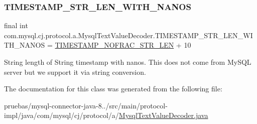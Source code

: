\subsubsection{\texorpdfstring{T\+I\+M\+E\+S\+T\+A\+M\+P\+\_\+\+S\+T\+R\+\_\+\+L\+E\+N\+\_\+\+W\+I\+T\+H\+\_\+\+N\+A\+N\+OS}{TIMESTAMP\_STR\_LEN\_WITH\_NANOS}}
{\footnotesize\ttfamily final int com.\+mysql.\+cj.\+protocol.\+a.\+Mysql\+Text\+Value\+Decoder.\+T\+I\+M\+E\+S\+T\+A\+M\+P\+\_\+\+S\+T\+R\+\_\+\+L\+E\+N\+\_\+\+W\+I\+T\+H\+\_\+\+N\+A\+N\+OS = \mbox{\hyperlink{classcom_1_1mysql_1_1cj_1_1protocol_1_1a_1_1_mysql_text_value_decoder_a8231f45af061c93c4b82283c5f00d0dc}{T\+I\+M\+E\+S\+T\+A\+M\+P\+\_\+\+N\+O\+F\+R\+A\+C\+\_\+\+S\+T\+R\+\_\+\+L\+EN}} + 10\hspace{0.3cm}{\ttfamily [static]}}

String length of String timestamp with nanos. This does not come from My\+S\+QL server but we support it via string conversion. 

The documentation for this class was generated from the following file\+:\begin{DoxyCompactItemize}
\item 
pruebas/mysql-\/connector-\/java-\/8../src/main/protocol-\/impl/java/com/mysql/cj/protocol/a/\mbox{\hyperlink{_mysql_text_value_decoder_8java}{Mysql\+Text\+Value\+Decoder.\+java}}\end{DoxyCompactItemize}
